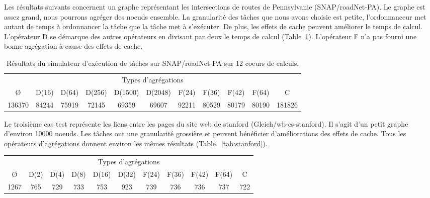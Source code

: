 Les résultats suivants concernent un graphe représentant les intersections de routes de Pennsylvanie (SNAP/roadNet-PA).
%
Le graphe est assez grand, nous pourrons agréger des noeuds ensemble.
%
La granularité des tâches que nous avons choisie est petite, l'ordonnanceur met autant de temps à ordonnancer la tâche que la tâche met à s'exécuter.
%
De plus, les effets de cache peuvent améliorer le temps de calcul.
%
L'opérateur D se démarque des autres opérateurs en divisant par deux le temps de calcul (Table~\ref{tab:roadnet}).
%
L'opérateur F n'a pas fourni une bonne agrégation à cause des effets de cache.


\begin{table}[h!]
\begin{center}
  \begin{tabular}{|c|c|c|c|c|c|c|c|c|c|c|}
    \hline
    \multicolumn{11}{|c|}{Types d'agrégations}\\
    \O & D(16) & D(64) & D(256) & D(1500) & D(2048) & F(24) & F(36) & F(42) & F(64) & C \\
    \hline
    136370 & 84244 & 75919 & 72145 & 69359 & 69607 & 92211 & 80529 & 80179 & 80190 & 181826 \\
    \hline
  \end{tabular}
  \caption{Résultats du simulateur d'exécution de tâches sur SNAP/roadNet-PA sur 12 coeurs de calculs.}
  \label{tab:roadnet}
\end{center}
\end{table}


Le troisième cas test représente les liens entre les pages du site web de stanford (Gleich/wb-cs-stanford).
%
Il s'agit d'un petit graphe d'environ 10000 noeuds.
%
Les tâches ont une granularité grossière et peuvent bénéficier d'améliorations des effets de cache.
%
Tous les opérateurs d'agrégations donnent environ les mêmes résultats (Table.~\ref{tab:stanford}).


\begin{center}
  \begin{tabular}{|c|c|c|c|c|c|c|c|c|c|c|}
    \hline
    \multicolumn{11}{|c|}{Types d'agrégations}\\
    \O & D(2) & D(4) & D(8) & D(16) & D(32) & F(24) & F(36) & F(42) & F(64) & C \\
    \hline
    1267 & 765 & 729 & 733 & 753 & 923 & 739 & 736 & 736 & 737 & 722 \\
    \hline
  \end{tabular}
  \label{tab:stanford}
\end{center}


